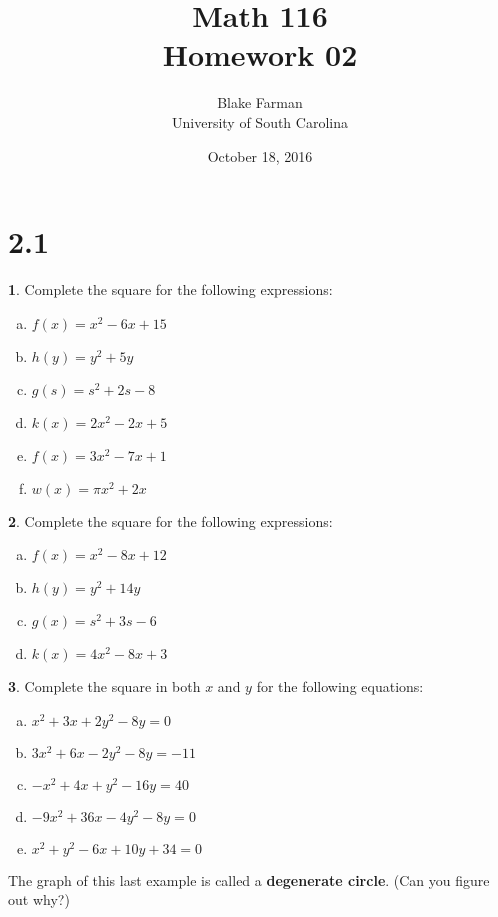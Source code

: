 \documentclass[12pt]{book}
\author{Blake Farman\\University of South Carolina}
\title{Math 116\\Homework 02}
\date{October 18, 2016}
\theoremstyle{definition}
\newtheorem{thm}{}
\begin{document}
\maketitle

\section*{2.1}

\begin{thm}
  Complete the square for the following expressions:
  \begin{enumerate}[(a)]
  \item
    $\displaystyle{f(x) = x^2 - 6x + 15}$
  \item
    $\displaystyle{h(y) = y^2 + 5y}$
  \item
    $\displaystyle{g(s) = s^2 + 2s - 8}$
  \item
    $\displaystyle{k(x) = 2x^2 - 2x + 5}$
  \item
    $\displaystyle{f(x) = 3x^2 - 7x + 1}$
  \item
    $\displaystyle{w(x) = \pi x^2 + 2x}$
  \end{enumerate}
\end{thm}

\begin{thm}
  Complete the square for the following expressions:
  \begin{enumerate}[(a)]
  \item
    $\displaystyle{f(x) = x^2 - 8x + 12}$
  \item
    $\displaystyle{h(y) = y^2 + 14y}$
  \item
    $\displaystyle{g(x) = s^2 + 3s - 6}$
  \item
    $\displaystyle{k(x) = 4x^2 - 8x + 3}$
  \end{enumerate}
\end{thm}

\setcounter{thm}{4}
\begin{thm}
  Complete the square in both $x$ and $y$ for the following equations:
  \begin{enumerate}[(a)]
  \item
    $\displaystyle{x^2 + 3x + 2y^2 - 8y = 0}$
  \item
    $\displaystyle{3x^2 + 6x - 2y^2 - 8y = -11}$
  \item
    $\displaystyle{-x ^2 + 4x + y^2 - 16y = 40}$
  \item
    $\displaystyle{-9x^2 + 36x - 4y^2 - 8y = 0}$
  \item
    $\displaystyle{x^2 + y^2 - 6x + 10y + 34 = 0}$
  \end{enumerate}
  The graph of this last example is called a {\bf degenerate circle}. (Can you figure out why?)
\end{thm}
\end{document}
